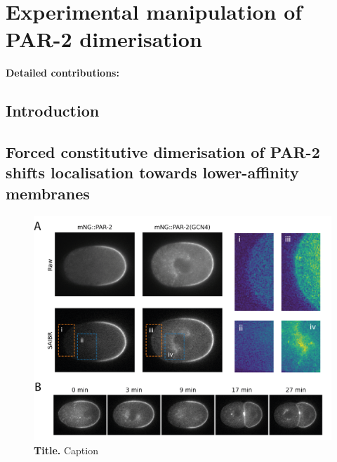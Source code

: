 \documentclass[12pt]{"report"}
\newcommand{\mycaption}[2]{\caption[#1]{\textbf{#1.} #2}}
\begin{document}
\chapter{Experimental manipulation of PAR-2 dimerisation}

\textbf{Detailed contributions:}\\

\clearpage
\section{Introduction}

\section{Forced constitutive dimerisation of PAR-2 shifts localisation towards lower-affinity membranes}



\begin{figure}[!h]
\includegraphics[scale=1]{gcn4}
\setlength{\abovecaptionskip}{20pt}
\centering
\mycaption{Title}{Caption}
\label{fig:gcn4}
\end{figure}
\end{document}
